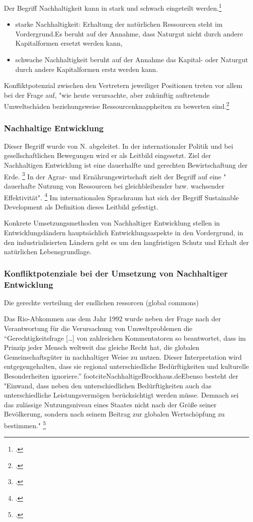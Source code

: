 \documentclass{article}
\begin{document}
\hfill \break
Der Begriff Nachhaltigkeit kann in stark und schwach eingeteilt werden.\footcite{Nachhaltigkeit}


\begin{itemize}
\item starke Nachhaltigkeit: Erhaltung der natürlichen Ressourcen steht im Vordergrund.Es beruht auf der Annahme, dass Naturgut nicht durch andere Kapitalformen ersetzt werden kann,
\item schwache Nachhaltigkeit beruht auf der Annahme das Kapital- oder Naturgut durch andere Kapitalformen erstz werden kann.
\end{itemize}
Konfliktpotenzial zwischen den Vertretern jeweiliger Positionen treten vor allem bei der Frage auf, "wie heute verursachte, aber zukünftig auftretende Umweltschäden beziehungsweise Ressourcenknappheiten zu bewerten sind.\footcite{NachhaltigeBrockhaus.de}



\subsubsection{Nachhaltige Entwicklung}
 Dieser Begriff wurde von N. abgeleitet. In der internationaler Politik und bei gesellschaftlichen Bewegungen wird er als Leitbild eingesetzt. Ziel der Nachhaltigen Entwicklung ist eine dauerhalfte und gerechten Bewirtschaftung der Erde. \footcite{NachhaltigeBrockhaus.de} In der Agrar- und Ernährungswirtschaft zielt der Begriff auf eine " dauerhafte Nutzung von Ressourcen bei gleichbleibender bzw. wachsender Effektivität". \footcite{oppenhauser2010nachhaltigkeit} Im internationalen Sprachraum hat sich der Begriff Sustainable Development als Definition dieses Leitbild gefestigt.
 
 Konkrete Umsetzungsmethoden von Nachhaltiger Entwicklung stellen in Entwicklungsländern hauptsächlich Entwicklungsaspekte in den Vordergrund, in den industrialisierten Ländern geht es um den langfristigen Schutz und Erhalt der natürlichen Lebensgrundlage. 

\subsubsection{Konfliktpotenziale bei der Umsetzung von Nachhaltiger Entwicklung}

Die gerechte verteilung der endlichen ressorcen (global commons)

Das Rio-Abkommen aus dem Jahr 1992 wurde neben der Frage nach der Verantwortung für die Verursachung von Umweltproblemen die “Gerechtigkeitsfrage […] von zahlreichen Kommentatoren so beantwortet, dass im Prinzip jeder Mensch weltweit das gleiche Recht hat, die globalen Gemeinschaftsgüter in nachhaltiger Weise zu nutzen. Dieser Interpretation wird entgegengehalten, dass sie regional unterschiedliche Bedürftigkeiten und kulturelle Besonderheiten ignoriere.” footcite{NachhaltigeBrockhaus.de}Ebenso besteht der "Einwand, dass neben den unterschiedlichen Bedürftigkeiten auch das unterschiedliche Leistungsvermögen berücksichtigt werden müsse. Demnach sei das zulässige Nutzungsniveau eines Staates nicht nach der Größe seiner Bevölkerung, sondern nach seinem Beitrag zur globalen Wertschöpfung zu bestimmen." \footcite{NachhaltigeBrockhaus.de}
\end{document}
